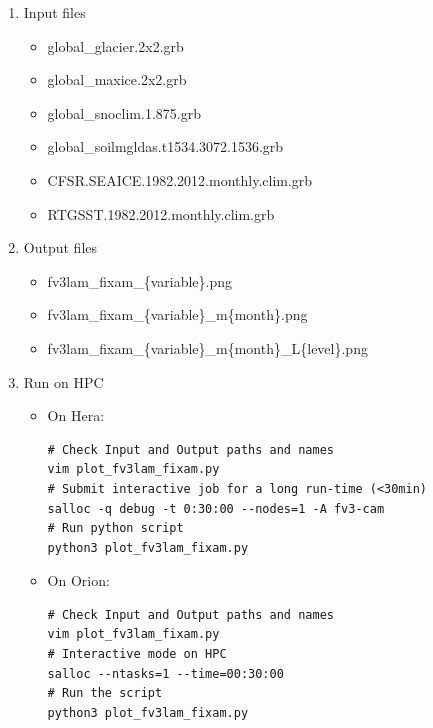 \documentclass[11pt,fleqn]{report}              %
\begin{document}
\begin{enumerate}
\item Input files
\begin{itemize}
\item global\_glacier.2x2.grb
\item global\_maxice.2x2.grb
\item global\_snoclim.1.875.grb
\item global\_soilmgldas.t1534.3072.1536.grb
\item CFSR.SEAICE.1982.2012.monthly.clim.grb
\item RTGSST.1982.2012.monthly.clim.grb
\end{itemize}
\item Output files
\begin{itemize}
\item fv3lam\_fixam\_\{variable\}.png
\item fv3lam\_fixam\_\{variable\}\_m\{month\}.png
\item fv3lam\_fixam\_\{variable\}\_m\{month\}\_L\{level\}.png
\end{itemize}
\item Run on HPC

\begin{itemize}
\item On Hera:
\lstset{language=bash}   
\begin{lstlisting}[frame=trBL]
# Check Input and Output paths and names
vim plot_fv3lam_fixam.py
# Submit interactive job for a long run-time (<30min)
salloc -q debug -t 0:30:00 --nodes=1 -A fv3-cam
# Run python script
python3 plot_fv3lam_fixam.py
\end{lstlisting}

\item On Orion:
\lstset{language=bash}   
\begin{lstlisting}[frame=trBL]
# Check Input and Output paths and names
vim plot_fv3lam_fixam.py
# Interactive mode on HPC
salloc --ntasks=1 --time=00:30:00 
# Run the script
python3 plot_fv3lam_fixam.py
\end{lstlisting}

\end{itemize}


\end{enumerate}
\end{document}
